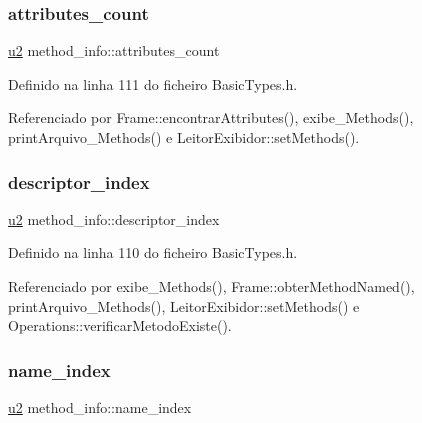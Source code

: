 \mbox{\label{structmethod__info_ad9e5e1e2fc850806addadd6deab8565d}} 
\subsubsection{\texorpdfstring{attributes\+\_\+count}{attributes\_count}}
{\footnotesize\ttfamily \hyperlink{BasicTypes_8h_a732cde1300aafb73b0ea6c2558a7a54f}{u2} method\+\_\+info\+::attributes\+\_\+count}



Definido na linha 111 do ficheiro Basic\+Types.\+h.



Referenciado por Frame\+::encontrar\+Attributes(), exibe\+\_\+\+Methods(), print\+Arquivo\+\_\+\+Methods() e Leitor\+Exibidor\+::set\+Methods().

\mbox{\label{structmethod__info_a7713103e0c8d060630ad62774fb9be37}} 
\subsubsection{\texorpdfstring{descriptor\+\_\+index}{descriptor\_index}}
{\footnotesize\ttfamily \hyperlink{BasicTypes_8h_a732cde1300aafb73b0ea6c2558a7a54f}{u2} method\+\_\+info\+::descriptor\+\_\+index}



Definido na linha 110 do ficheiro Basic\+Types.\+h.



Referenciado por exibe\+\_\+\+Methods(), Frame\+::obter\+Method\+Named(), print\+Arquivo\+\_\+\+Methods(), Leitor\+Exibidor\+::set\+Methods() e Operations\+::verificar\+Metodo\+Existe().

\mbox{\label{structmethod__info_ab91d62d0658b77bba83f6bb685e3bbb9}} 
\subsubsection{\texorpdfstring{name\+\_\+index}{name\_index}}
{\footnotesize\ttfamily \hyperlink{BasicTypes_8h_a732cde1300aafb73b0ea6c2558a7a54f}{u2} method\+\_\+info\+::name\+\_\+index}



